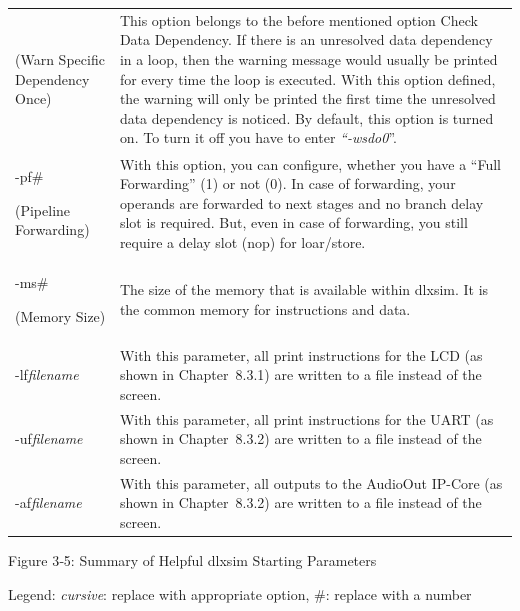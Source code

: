 \documentclass[
]{article}
\begin{document}
\begin{longtable}[]{@{}ll@{}}
\begin{minipage}[t]{0.47\columnwidth}
(Warn Specific Dependency Once)\strut
\end{minipage} & \begin{minipage}[t]{0.47\columnwidth}\raggedright
This option belongs to the before mentioned option Check Data
Dependency. If there is an unresolved data dependency in a loop, then
the warning message would usually be printed for every time the loop is
executed. With this option defined, the warning will only be printed the
first time the unresolved data dependency is noticed. By default, this
option is turned on. To turn it off you have to enter
\emph{``-wsdo0}''.\strut
\end{minipage}\tabularnewline
\begin{minipage}[t]{0.47\columnwidth}\raggedright
-pf\#

(Pipeline Forwarding)\strut
\end{minipage} & \begin{minipage}[t]{0.47\columnwidth}\raggedright
With this option, you can configure, whether you have a ``Full
Forwarding'' (1) or not (0). In case of forwarding, your operands are
forwarded to next stages and no branch delay slot is required. But, even
in case of forwarding, you still require a delay slot (nop) for
loar/store.\strut
\end{minipage}\tabularnewline
\begin{minipage}[t]{0.47\columnwidth}\raggedright
-ms\#

(Memory Size)\strut
\end{minipage} & \begin{minipage}[t]{0.47\columnwidth}\raggedright
The size of the memory that is available within dlxsim. It is the common
memory for instructions and data.\strut
\end{minipage}\tabularnewline
-lf\emph{filename} & With this parameter, all print instructions for the
LCD (as shown in Chapter~8.3.1) are written to a file instead of the
screen.\tabularnewline
-uf\emph{filename} & With this parameter, all print instructions for the
UART (as shown in Chapter~8.3.2) are written to a file instead of the
screen.\tabularnewline
-af\emph{filename} & With this parameter, all outputs to the AudioOut
IP-Core (as shown in Chapter~8.3.2) are written to a file instead of the
screen.\tabularnewline
\bottomrule
\end{longtable}

Figure 3‑5: Summary of Helpful dlxsim Starting Parameters

Legend: \emph{cursive}: replace with appropriate option, \#: replace
with a number
\end{document}
